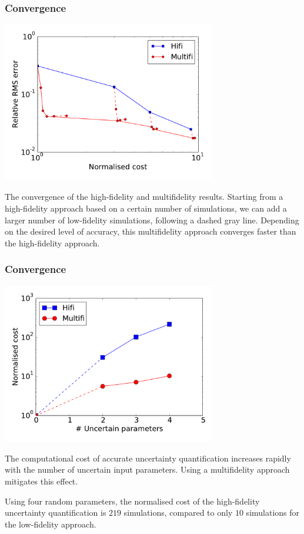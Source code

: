 \documentclass[11pt,ucs]{beamer}
\begin{document}
\begin{frame}\frametitle{Convergence}

\begin{center}
\includegraphics[width=0.7\textwidth]{illustrate1d_converge}
\end{center}

\small{
The convergence of the high-fidelity and multifidelity results. Starting from a high-fidelity approach based on a certain number of simulations, we can add a larger number of low-fidelity simulations, following a dashed gray line. Depending on the desired level of accuracy, this multifidelity approach converges faster than the high-fidelity approach.}


\end{frame}



\begin{frame}\frametitle{Convergence}

\begin{center}
\includegraphics[width=0.7\textwidth]{scaling}
\end{center}

\small{
The computational cost of accurate uncertainty quantification increases rapidly with the number of uncertain input parameters. Using a multifidelity approach mitigates this effect.

Using four random parameters, the normalised cost of the high-fidelity uncertainty quantification is $219$ simulations, compared to only $10$ simulations for the low-fidelity approach.}

\end{frame}
\end{document}
